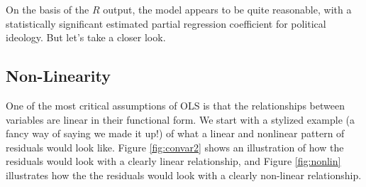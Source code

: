 \documentclass[11pt,openany]{book}\usepackage[]{graphicx}\usepackage[]{color}
\begin{document}
{On the basis of the $R$ output, the model appears to be quite reasonable, with a statistically significant estimated partial regression coefficient for political ideology. But let's take a closer look.

\subsection{Non-Linearity} 

One of the most critical assumptions of OLS is that the relationships between variables are linear in their functional form. We start with a stylized example (a fancy way of saying we made it up!) of what a linear and nonlinear pattern of residuals would look like. Figure \ref{fig:convar2} shows an illustration of how the residuals would look with a clearly linear relationship, and Figure \ref{fig:nonlin} illustrates how the the residuals would look with a clearly non-linear relationship.  





}
\end{document}
